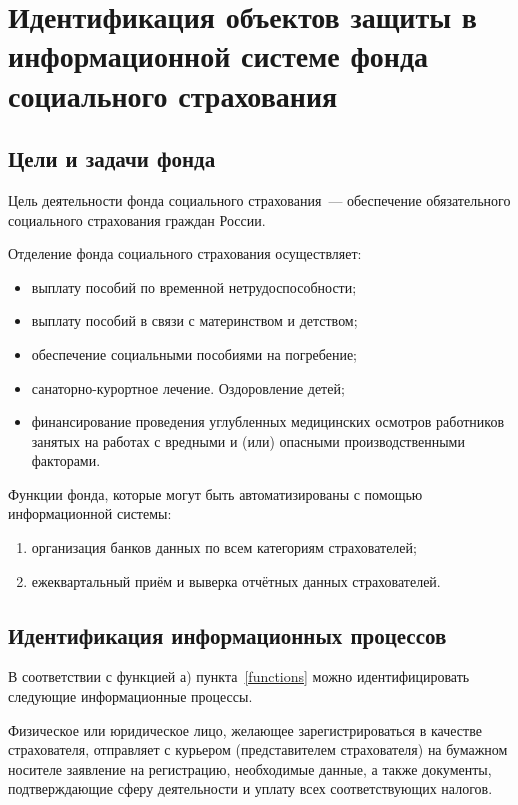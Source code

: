 \section{Идентификация объектов защиты в
  информационной системе фонда
  социального страхования}

\subsection{Цели и задачи фонда}

\point Цель деятельности фонда социального страхования~--- обеспечение обязательного социального страхования граждан России.

\point Отделение фонда социального страхования осуществляет:

\begin{itemize}
\item выплату пособий по временной нетрудоспособности;
\item выплату пособий в связи с материнством и детством;
\item обеспечение социальными пособиями на погребение;
\item санаторно-курортное лечение. Оздоровление детей;
\item финансирование проведения углубленных медицинских осмотров работников занятых на работах с вредными и (или) опасными производственными факторами.
\end{itemize}

\point Функции фонда, которые могут быть автоматизированы с помощью информационной системы: \label{functions}

\begin{enumerate}
\item организация банков данных по всем категориям страхователей;
\item ежеквартальный приём и выверка отчётных данных страхователей.
\end{enumerate}

\subsection{Идентификация информационных процессов}

В соответствии с функцией а) пункта~\ref{functions} можно идентифицировать следующие информационные процессы.

\point Физическое или юридическое лицо, желающее зарегистрироваться в качестве страхователя, отправляет с курьером (представителем страхователя) на бумажном носителе заявление на регистрацию, необходимые данные, а также документы, подтверждающие сферу деятельности и уплату всех соответствующих налогов.

